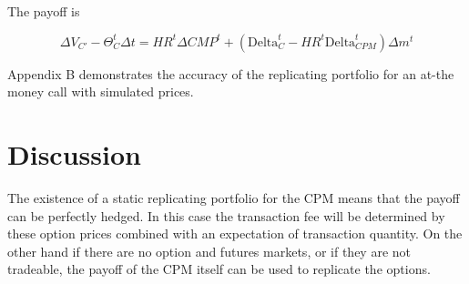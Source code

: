 \documentclass[12pt]{article}
\begin{document}
The payoff is

\begin{equation}
\label{VCPrime}
 \Delta V_{C'} - \Theta_C^t \Delta t  = HR^t \Delta CMP^t + \left(\text{Delta}_C^t - HR^t \text{Delta}_{CPM}^t \right) \Delta m^t    
\end{equation}

Appendix B demonstrates the accuracy of the replicating portfolio for an at-the money call with simulated prices. 


\section{Discussion}

The existence of a static replicating portfolio for the CPM means that the payoff can be perfectly hedged. In this case the transaction fee will be determined by these option prices combined with an expectation of transaction quantity. On the other hand if there are no option and futures markets, or if they are not tradeable, the payoff of the CPM itself can be used to replicate the options. 







\singlespacing
\setlength\bibsep{0pt}





\clearpage

\onehalfspacing

\end{document}
